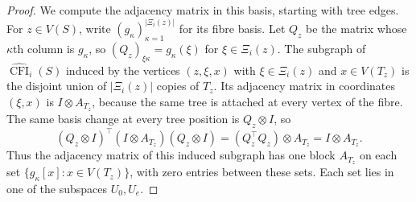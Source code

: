 \documentclass[11pt,a4paper]{article}
\theoremstyle{plain}
\theoremstyle{definition}
\DeclareMathOperator{\CFI}{CFI}
\begin{document}
\begin{proof}
We compute the adjacency matrix in this basis, starting with tree edges.
For $z\in V(S)$, write $(g_\kappa)_{\kappa=1}^{|\Xi_i(z)|}$ for its fibre basis.
Let $Q_z$ be the matrix whose $\kappa$th column is $g_\kappa$, so
$(Q_z)_{\xi\kappa}=g_\kappa(\xi)$ for $\xi\in \Xi_i(z)$.
The subgraph of $\widehat{\CFI}_i(S)$ induced by the vertices $(z,\xi,x)$ with
$\xi\in \Xi_i(z)$ and $x\in V(T_z)$ is the disjoint union of $|\Xi_i(z)|$ copies
of $T_z$. Its adjacency matrix in coordinates $(\xi,x)$ is $I\otimes A_{T_z}$,
because the same tree is attached at every vertex of the fibre.
The same basis change at every tree position is $Q_z\otimes I$, so
\begin{equation}\label{eq:ss-tree-blocks}
 (Q_z\otimes I)^{\top}(I\otimes A_{T_z})(Q_z\otimes I)
 =(Q_z^{\top}Q_z)\otimes A_{T_z}
 =I\otimes A_{T_z}.
\end{equation}
Thus the adjacency matrix of this induced subgraph has one block $A_{T_z}$
on each set $\{g_\kappa[x]:x\in V(T_z)\}$, with zero entries between these sets.
Each set lies in one of the subspaces $U_0,U_e$.


\end{proof}
\end{document}
